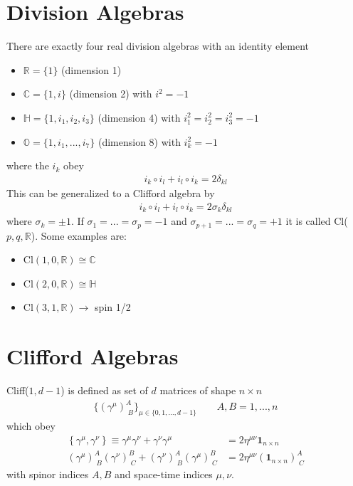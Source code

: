 \documentclass[10pt,a4paper]{book}
\theoremstyle{definition}
\begin{document}
\section{Division Algebras}
There are exactly four real division algebras with an identity element
\begin{itemize}
\item $\mathbb{R}=\{1\}$ (dimension 1)
\item $\mathbb{C}=\{1,i\}$ (dimension 2) with $i^2=-1$
\item $\mathbb{H}=\{1,i_1,i_2,i_3\}$  (dimension 4) with $i_1^2=i_2^2=i_3^2=-1$
\item $\mathbb{O}=\{1,i_1,...,i_7\}$ (dimension 8) with $i_k^2=-1$
\end{itemize}
where the $i_k$ obey
\begin{align}
i_k\circ i_l + i_l\circ i_k = 2\delta_{kl}
\end{align}
This can be generalized to a Clifford algebra by
\begin{align}
i_k\circ i_l + i_l\circ i_k = 2\sigma_k\delta_{kl}
\end{align}
where $\sigma_k=\pm1$. If $\sigma_1=...=\sigma_p=-1$ and $\sigma_{p+1}=...=\sigma_q=+1$ it is called Cl($p,q,\mathbb{R}$). Some examples are:
\begin{itemize}
\item $\text{Cl}(1,0,\mathbb{R})\cong\mathbb{C}$
\item $\text{Cl}(2,0,\mathbb{R})\cong\mathbb{H}$
\item $\text{Cl}(3,1,\mathbb{R})\rightarrow$ spin 1/2
\end{itemize}




\section{Clifford Algebras}
Cliff($1,d-1$) is defined as set of $d$ matrices of shape $n\times n$
\begin{align}
\{(\gamma^\mu)^A_{\;B}\}_{\mu\in\{0,1,...,d-1\}}\qquad A,B=1,...,n
\end{align}
which obey
\begin{align}
\left\{\gamma^\mu,\gamma^\nu\right\}\equiv\gamma^\mu\gamma^\nu+\gamma^\nu\gamma^\mu&=2\eta^{\mu\nu}\mathbf{1}_{n\times n}\\
(\gamma^\mu)^A_{\;B}(\gamma^\nu)^B_{\;C}+(\gamma^\nu)^A_{\;B}(\gamma^\mu)^B_{\;C}&=2\eta^{\mu\nu}(\mathbf{1}_{n\times n})^A_{\;C}
\end{align}
with spinor indices $A, B$ and space-time indices $\mu, \nu$.
\end{document}
